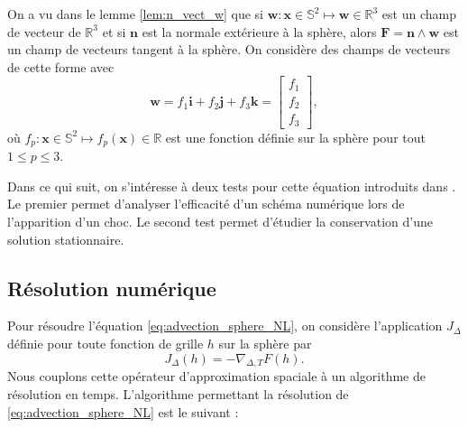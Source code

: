 On a vu dans le lemme \ref{lem:n_vect_w} que si $\mathbf{w} : \mathbf{x} \in \mathbb{S}^2 \mapsto \mathbf{w} \in \mathbb{R}^3$ est un champ de vecteur de $\mathbb{R}^3$ et si $\mathbf{n}$ est la normale extérieure à la sphère, alors $\mathbf{F} = \mathbf{n} \wedge \mathbf{w}$ est un champ de vecteurs tangent à la sphère. On considère des champs de vecteurs de cette forme avec 
\begin{equation}
\mathbf{w} = f_1 \mathbf{i} + f_2 \mathbf{j}+ f_3 \mathbf{k} = \begin{bmatrix}
f_1 \\ f_2 \\ f_3
\end{bmatrix},
\end{equation}
où $f_p : \mathbf{x} \in \mathbb{S}^2 \mapsto f_p(\mathbf{x}) \in \mathbb{R}$ est une fonction définie sur la sphère pour tout $1 \leq p \leq 3$.


Dans ce qui suit, on s'intéresse à deux tests pour cette équation introduits dans \cite{BenArtzi2009}. Le premier permet d'analyser l'efficacité d'un schéma numérique lors de l'apparition d'un choc. Le second test permet d'étudier la conservation d'une solution stationnaire.










\subsection{Résolution numérique}

Pour résoudre l'équation \eqref{eq:advection_sphere_NL}, on considère l'application $J_{\Delta}$ définie pour toute fonction de grille $h$ sur la sphère par
\begin{equation}
J_{\Delta}(h) = - \nabla_{\Delta, T} F(h).
\end{equation}
Nous couplons cette opérateur d'approximation spaciale à un algorithme de résolution en temps. L'algorithme permettant la résolution de \eqref{eq:advection_sphere_NL} est le suivant :

